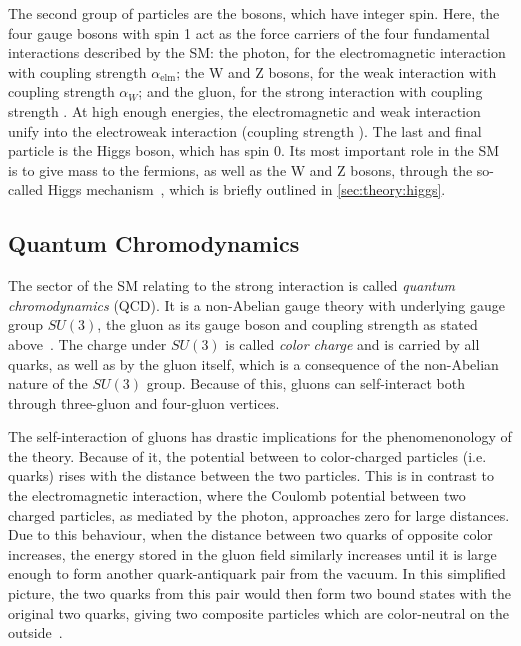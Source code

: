 The second group of particles are the bosons, which have integer spin. Here, the four gauge bosons with spin 1 act as the force carriers of the four fundamental interactions described by the SM: the photon, for the electromagnetic interaction with coupling strength $\alpha_{\mathrm{elm}}$; the W and Z bosons, for the weak interaction with coupling strength $\alpha_W$; and the gluon, for the strong interaction with coupling strength \alphas. At high enough energies, the electromagnetic and weak interaction unify into the electroweak interaction (coupling strength \alphaew). The last and final particle is the Higgs boson, which has spin 0. Its most important role in the SM is to give mass to the fermions, as well as the W and Z bosons, through the so-called Higgs mechanism~\cite{Higgs:1964ia,Englert:1964et}, which is briefly outlined in \cref{sec:theory:higgs}.

\subsection{Quantum Chromodynamics}
\label{sec:theory:qcd}

The sector of the SM relating to the strong interaction is called \textit{quantum chromodynamics} (QCD). It is a non-Abelian gauge theory with underlying gauge group $SU(3)$, the gluon as its gauge boson and coupling strength \alphas as stated above~\cite{Schwartz:2014sze,Peskin:1995ev}. The charge under $SU(3)$ is called \textit{color charge} and is carried by all quarks, as well as by the gluon itself, which is a consequence of the non-Abelian nature of the $SU(3)$ group. Because of this, gluons can self-interact both through three-gluon and four-gluon vertices.

The self-interaction of gluons has drastic implications for the phenomenonology of the theory. Because of it, the potential between to color-charged particles (i.e. quarks) rises with the distance between the two particles. This is in contrast to the electromagnetic interaction, where the Coulomb potential between two charged particles, as mediated by the photon, approaches zero for large distances. Due to this behaviour, when the distance between two quarks of opposite color increases, the energy stored in the gluon field similarly increases until it is large enough to form another quark-antiquark pair from the vacuum. In this simplified picture, the two quarks from this pair would then form two bound states with the original two quarks, giving two composite particles which are color-neutral on the outside~\cite{Schwartz:2014sze}.

